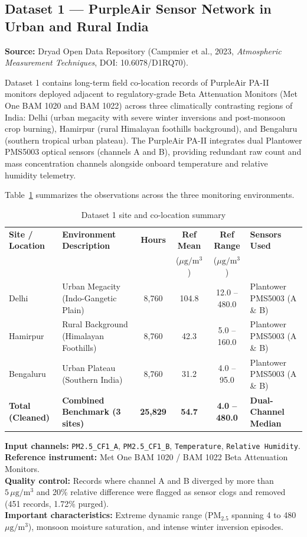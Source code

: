 \documentclass[11pt,a4paper]{article}
\begin{document}
\subsection{Dataset 1 --- PurpleAir Sensor Network in Urban and Rural India}
\textbf{Source:} Dryad Open Data Repository (Campmier et al., 2023, \textit{Atmospheric Measurement Techniques}, DOI: 10.6078/D1RQ70).

Dataset 1 contains long-term field co-location records of PurpleAir PA-II monitors deployed adjacent to regulatory-grade Beta Attenuation Monitors (Met One BAM 1020 and BAM 1022) across three climatically contrasting regions of India: Delhi (urban megacity with severe winter inversions and post-monsoon crop burning), Hamirpur (rural Himalayan foothills background), and Bengaluru (southern tropical urban plateau). The PurpleAir PA-II integrates dual Plantower PMS5003 optical sensors (channels A and B), providing redundant raw count and mass concentration channels alongside onboard temperature and relative humidity telemetry.

Table~\ref{tab:dataset1} summarizes the observations across the three monitoring environments.

\begin{table}[htbp]
\centering
\small
\caption{Dataset 1 site and co-location summary}
\label{tab:dataset1}
\begin{tabularx}{\textwidth}{l X c c c l}
\toprule
\textbf{Site / Location} & \textbf{Environment Description} & \textbf{Hours} & \textbf{Ref Mean} & \textbf{Ref Range} & \textbf{Sensors Used} \\
& & & ($\mu\text{g}/\text{m}^3$) & ($\mu\text{g}/\text{m}^3$) & \\
\midrule
Delhi & Urban Megacity (Indo-Gangetic Plain) & 8,760 & 104.8 & 12.0 -- 480.0 & Plantower PMS5003 (A \& B) \\
Hamirpur & Rural Background (Himalayan Foothills) & 8,760 & 42.3 & 5.0 -- 160.0 & Plantower PMS5003 (A \& B) \\
Bengaluru & Urban Plateau (Southern India) & 8,760 & 31.2 & 4.0 -- 95.0 & Plantower PMS5003 (A \& B) \\
\midrule
\textbf{Total (Cleaned)} & \textbf{Combined Benchmark (3 sites)} & \textbf{25,829} & \textbf{54.7} & \textbf{4.0 -- 480.0} & \textbf{Dual-Channel Median} \\
\bottomrule
\end{tabularx}
\end{table}

\noindent \textbf{Input channels:} \texttt{PM2.5\_CF1\_A}, \texttt{PM2.5\_CF1\_B}, \texttt{Temperature}, \texttt{Relative Humidity}. \\
\textbf{Reference instrument:} Met One BAM 1020 / BAM 1022 Beta Attenuation Monitors. \\
\textbf{Quality control:} Records where channel A and B diverged by more than $5\,\mu\text{g}/\text{m}^3$ and 20\% relative difference were flagged as sensor clogs and removed (451 records, 1.72\% purged). \\
\textbf{Important characteristics:} Extreme dynamic range ($\text{PM}_{2.5}$ spanning 4 to 480\,$\mu\text{g}/\text{m}^3$), monsoon moisture saturation, and intense winter inversion episodes.
\end{document}
